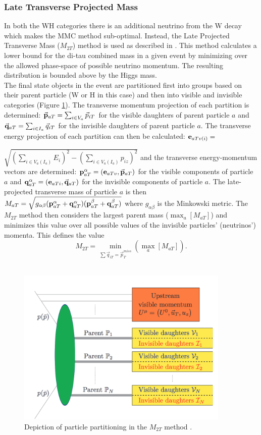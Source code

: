 \subsubsection{Late Transverse Projected Mass}
In both the WH categories there is an additional neutrino from the W decay which makes the MMC method sub-optimal. Instead, the Late Projected Transverse Mass ($M_{2T}$) method is used as described in \cite{m2t}. This method calculates a lower bound for the di-tau combined mass in a given event by minimizing over the allowed phase-space of possible neutrino momentum. The resulting distribution is bounded above by the Higgs mass.\\

The final state objects in the event are partitioned first into groups based on their parent particle (W or H in this case) and then into visible and invisible categories (Figure \ref{fig:m2t_diag}). The transverse momentum projection of each partition is determined: $\Vec{\bf{p}}_{aT}=\sum_{i \in V_a}\Vec{p}_{iT}$ for the visible daughters of parent particle $a$ and $\Vec{\bf{q}}_{aT}=\sum_{i \in I_a}\Vec{q}_{iT}$ for the invisible daughters of parent particle $a$. The transverse energy projection of each partition can then be calculated: ${\bf{e}}_{aTv(i)}=$

\noindent $\sqrt{(\sum_{i \in V_a(I_a)}E_i)^2-(\sum_{i \in V_{a}(I_a)}p_{iz})^2}$ and the transverse energy-momentum vectors are determined: ${\bf{p}}^{\alpha}_{aT}=({\bf{e}}_{aTv},\Vec{\bf{p}}_{aT})$ for the visible components of particle $a$ and ${\bf{q}}^{\alpha}_{aT}=({\bf{e}}_{aTi},\Vec{\bf{q}}_{aT})$ for the invisible components of particle $a$. The late-projected transverse mass of particle $a$ is then $M_{aT}=\sqrt{g_{\alpha\beta}({\bf{p}}^{\alpha}_{aT}+{\bf{q}}^{\alpha}_{aT})({\bf{p}}^{\beta}_{aT}+{\bf{q}}^{\beta}_{aT})}$ where $g_{\alpha\beta}$ is the Minkowski metric. The $M_{2T}$ method then considers the largest parent mass ($\max_{a}[M_{aT}]$) and minimizes this value over all possible values of the invisible particles' (neutrinos') momenta. This defines the value 
$$M_{2T}=\min_{\sum\Vec{q}_{iT}=\Vec{p}_T^{miss}}(\max_{a}[M_{aT}]).
$$\\

\begin{figure}[htb!]
    \centering
    \includegraphics[width=4in]{figures/chapter6/m2t_diag.png}
    \caption{Depiction of particle partitioning in the $M_{2T}$ method \cite{m2t}.}
    \label{fig:m2t_diag}
\end{figure}

